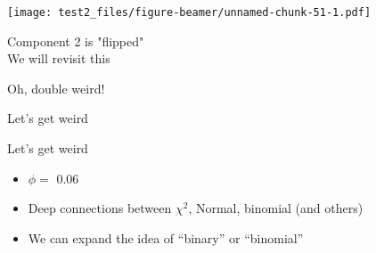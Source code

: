 \documentclass[
  ignorenonframetext,
]{beamer}
\begin{document}
\begin{frame}

\texttt{[image: test2\_files/figure-beamer/unnamed-chunk-51-1.pdf]}

\begin{center}Component 2 is "flipped" \\
We will revisit this
\end{center}

\end{frame}

\begin{frame}

\begin{table}[H]
\centering
{}
\end{table}
\begin{center}Oh, double weird!\end{center}

\end{frame}

\begin{frame}{Let's get weird}
\protect\hypertarget{lets-get-weird}{}

\begin{table}[H]
\centering
{}
\end{table}

\end{frame}

\begin{frame}{Let's get weird}
\protect\hypertarget{lets-get-weird-1}{}

\begin{table}[H]
\centering
{}
\end{table}

\begin{itemize}[<+->]
\item
  \(\phi=\) 0.06
\item
  Deep connections between \(\chi^2\), Normal, binomial (and others)
\item
  We can expand the idea of ``binary'' or ``binomial''
\end{itemize}

\end{frame}
\end{document}
